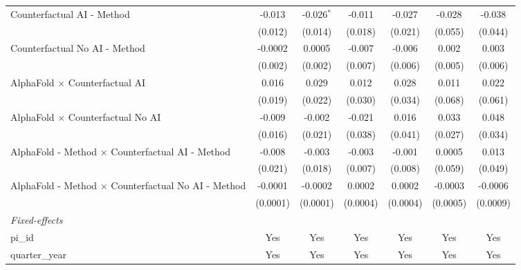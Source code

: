 \begin{tabular}{lcccccc}
   Counterfactual AI - Method                                 & -0.013   & -0.026$^{*}$  & -0.011   & -0.027        & -0.028       & -0.038\\   
                                                              & (0.012)  & (0.014)       & (0.018)  & (0.021)       & (0.055)      & (0.044)\\   
   Counterfactual No AI - Method                              & -0.0002  & 0.0005        & -0.007   & -0.006        & 0.002        & 0.003\\   
                                                              & (0.002)  & (0.002)       & (0.007)  & (0.006)       & (0.005)      & (0.006)\\   
   AlphaFold $\times$ Counterfactual AI                       & 0.016    & 0.029         & 0.012    & 0.028         & 0.011        & 0.022\\   
                                                              & (0.019)  & (0.022)       & (0.030)  & (0.034)       & (0.068)      & (0.061)\\   
   AlphaFold $\times$ Counterfactual No AI                    & -0.009   & -0.002        & -0.021   & 0.016         & 0.033        & 0.048\\   
                                                              & (0.016)  & (0.021)       & (0.038)  & (0.041)       & (0.027)      & (0.034)\\   
   AlphaFold - Method $\times$ Counterfactual AI - Method     & -0.008   & -0.003        & -0.003   & -0.001        & 0.0005       & 0.013\\   
                                                              & (0.021)  & (0.018)       & (0.007)  & (0.008)       & (0.059)      & (0.049)\\   
   AlphaFold - Method $\times$ Counterfactual No AI - Method  & -0.0001  & -0.0002       & 0.0002   & 0.0002        & -0.0003      & -0.0006\\   
                                                              & (0.0001) & (0.0001)      & (0.0004) & (0.0004)      & (0.0005)     & (0.0009)\\   
   \midrule
   \emph{Fixed-effects}\\
   pi\_id                                                     & Yes      & Yes           & Yes      & Yes           & Yes          & Yes\\  
   quarter\_year                                              & Yes      & Yes           & Yes      & Yes           & Yes          & Yes\\  

\end{tabular}
